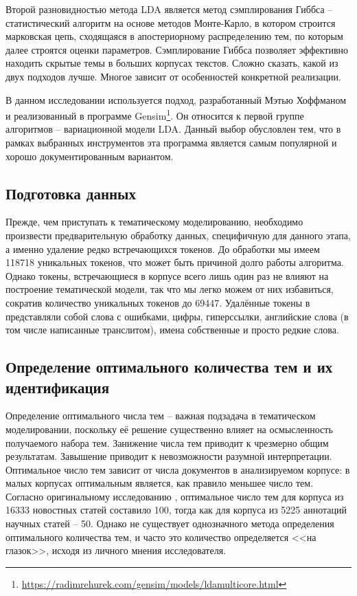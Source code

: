 Второй разновидностью метода LDA является метод сэмплирования Гиббса -- статистический алгоритм на основе методов Монте-Карло, в котором строится марковская цепь, сходящаяся в апостериорному распределению тем, по которым далее строятся оценки параметров. Сэмплирование Гиббса позволяет эффективно находить скрытые темы в больших корпусах текстов. Сложно сказать, какой из двух подходов лучше. Многое зависит от особенностей конкретной реализации.

В данном исследовании используется подход, разработанный Мэтью Хоффманом \cite{HoffmanBB10} и реализованный в программе Gensim\footnote{\href{https://radimrehurek.com/gensim/models/ldamulticore.html}{https://radimrehurek.com/gensim/models/ldamulticore.html}}. Он относится к первой группе алгоритмов -- вариационной модели LDA. Данный выбор обусловлен тем, что в рамках выбранных инструментов эта программа является самым популярной и хорошо документированным вариантом.


\subsection{Подготовка данных}
Прежде, чем приступать к тематическому моделированию, необходимо произвести предварительную обработку данных, специфичную для данного этапа, а именно удаление редко встречающихся токенов. До обработки мы имеем 118718 уникальных токенов, что может быть причиной долго работы алгоритма. Однако токены, встречающиеся в корпусе всего лишь один раз не влияют на построение тематической модели, так что мы легко можем от них избавиться, сократив количество уникальных токенов до 69447. Удалённые токены в представляли собой слова с ошибками, цифры, гиперссылки, английские слова (в том числе написанные транслитом), имена собственные и просто редкие слова.

\subsection{Определение оптимального количества тем и их идентификация}
Определение оптимального числа тем -- важная подзадача в тематическом моделировании, поскольку её решение существенно влияет на осмысленность получаемого набора тем. Занижение числа тем приводит к чрезмерно общим результатам. Завышение приводит к невозможности разумной интерпретации. Оптимальное число тем зависит от числа документов в анализируемом корпусе: в малых корпусах оптимальным является, как правило меньшее число тем. Согласно оригинальному исследованию \cite{LDAOrigin}, оптимальное число тем для корпуса из 16333 новостных статей составило 100, тогда как для корпуса из 5225 аннотаций научных статей -- 50. Однако не существует однозначного метода определения оптимального количества тем, и часто это количество определяется <<на глазок>>, исходя из личного мнения исследователя. 

